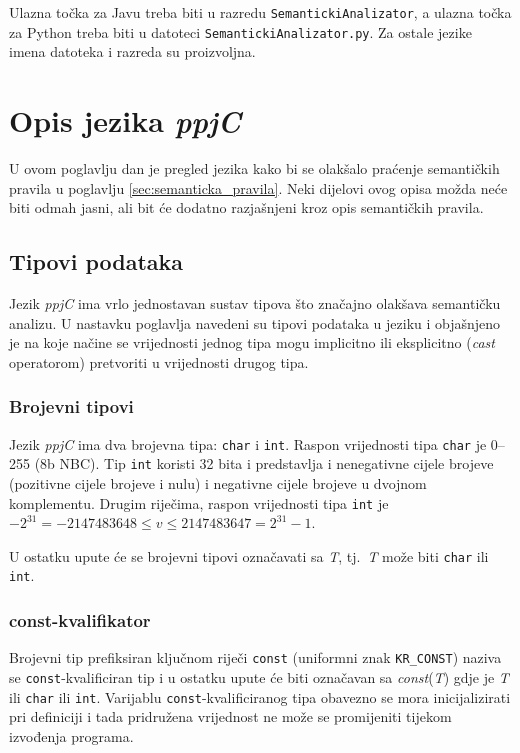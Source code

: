\documentclass[times, 12pt, utf8]{book}
\begin{document}
Ulazna točka za Javu treba biti u razredu \verb|SemantickiAnalizator|, a ulazna točka za Python treba biti u datoteci \verb|SemantickiAnalizator.py|.
Za ostale jezike imena datoteka i razreda su proizvoljna.


\section{Opis jezika \emph{ppjC}}
U ovom poglavlju dan je pregled jezika kako bi se olakšalo praćenje semantičkih pravila u poglavlju \ref{sec:semanticka_pravila}.
Neki dijelovi ovog opisa možda neće biti odmah jasni, ali bit će dodatno razjašnjeni kroz opis semantičkih pravila.

\subsection{Tipovi podataka}
Jezik \emph{ppjC} ima vrlo jednostavan sustav tipova što značajno olakšava semantičku analizu.
U nastavku poglavlja navedeni su tipovi podataka u jeziku i objašnjeno je na koje načine se vrijednosti jednog tipa mogu implicitno ili eksplicitno (\emph{cast} operatorom) pretvoriti u vrijednosti drugog tipa.

\subsubsection{Brojevni tipovi}
Jezik \emph{ppjC} ima dva brojevna tipa: \verb|char| i \verb|int|.
Raspon vrijednosti tipa \verb|char| je 0--255 (8b NBC).
Tip \verb|int| koristi 32 bita i predstavlja i nenegativne cijele brojeve (pozitivne cijele brojeve i nulu) i negativne cijele brojeve u dvojnom komplementu.
Drugim riječima, raspon vrijednosti tipa \verb|int| je \(-2^{31} = -2147483648 \le v \le 2147483647 = 2^{31} - 1\).

U ostatku upute će se brojevni tipovi označavati sa \emph{T}, tj.~\emph{T} može biti \verb|char| ili \verb|int|.

\subsubsection{const-kvalifikator}
Brojevni tip prefiksiran ključnom riječi \verb|const| (uniformni znak \verb|KR_CONST|) naziva se \verb|const|-kvalificiran tip i u ostatku upute će biti označavan sa \emph{const}(\emph{T}) gdje je \emph{T} ili \verb|char| ili \verb|int|.
Varijablu \verb|const|-kvalificiranog tipa obavezno se mora inicijalizirati pri definiciji i tada pridružena vrijednost ne može se promijeniti tijekom izvođenja programa.
\end{document}
